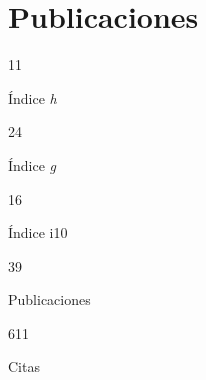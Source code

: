 \documentclass[11pt,a4paper,]{awesome-cv}
\begin{document}
\hypertarget{publicaciones}{%
\section{Publicaciones}\label{publicaciones}}

\begin{tcolorbox}[enhanced,
        on line, 
        boxsep=4pt, left=0pt,right=0pt,top=0pt,bottom=0pt,
        colframe=white,colback=teal,
        hyperurl=https://scholar.google.com/citations?user=8Q0jKHsAAAAJ]
  
\color{white}
\begin{minipage}[c]{0.195\linewidth}
  \begin{center} \begin{huge} 11 \end{huge}
  \begin{small} Índice \textit{h} \end{small} \end{center} 
\end{minipage} \begin{minipage}[c]{0.195\linewidth}
  \begin{center} \begin{huge} 24 \end{huge}
  \begin{small} Índice \textit{g} \end{small} \end{center}
\end{minipage} \begin{minipage}[c]{0.195\linewidth}
  \begin{center} \begin{huge} 16 \end{huge}
  \begin{small} Índice i10 \end{small} \end{center}
\end{minipage} \begin{minipage}[c]{0.195\linewidth}
  \begin{center} \begin{huge} 39 \end{huge}
  \begin{small} Publicaciones \end{small} \end{center}
\end{minipage} \begin{minipage}[c]{0.195\linewidth}  
  \begin{center} \begin{huge} 611 \end{huge} 
  \begin{small} Citas \end{small} \end{center}
\end{minipage}
\end{tcolorbox}
\end{document}
